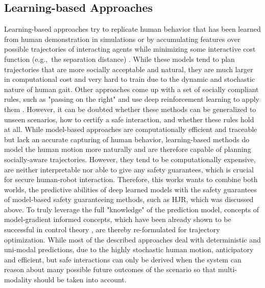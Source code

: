 \subsection{Learning-based Approaches}
Learning-based approaches try to replicate human behavior that has been learned from human demonstration in simulations or by accumulating features over possible trajectories of interacting agents while minimizing some interactive cost function (e.g.,\ the separation distance) \cite{Kim2016}\cite{Kretzschmar2016}. While these models tend to plan trajectories that are more socially acceptable and natural, they are much larger in computational cost and very hard to train due to the dynamic and stochastic nature of human gait. Other approaches come up with a set of socially compliant rules, such as "passing on the right" and use deep reinforcement learning to apply them  \cite{Knepper2012}\cite{Chen2017}\cite{Everett2018}. However, it can be doubted whether these methods can be generalized to unseen scenarios, how to certify a safe interaction, and whether these rules hold at all.
\newline\newline
While model-based approaches are computationally efficient and traceable but lack an accurate capturing of human behavior, learning-based methods do model the human motion more naturally and are therefore capable of planning socially-aware trajectories. However, they tend to be computationally expensive, are neither interpretable nor able to give any safety guarantees, which is crucial for secure human-robot interaction. Therefore, this works wants to combine both worlds, the predictive abilities of deep learned models with the safety guarantees of model-based safety guaranteeing methods, such as \ac{HJR}, which was discussed above. To truly leverage the full "knowledge" of the prediction model, concepts of model-gradient informed concepts, which have been already shown to be successful in control theory \cite{Chen2019}\cite{Fan2020}, are thereby re-formulated for trajectory optimization. While most of the described approaches deal with deterministic and uni-modal predictions, due to the highly stochastic human motion, anticipatory and efficient, but safe interactions can only be derived when the system can reason about many possible future outcomes of the scenario so that multi-modality should be taken into account.

